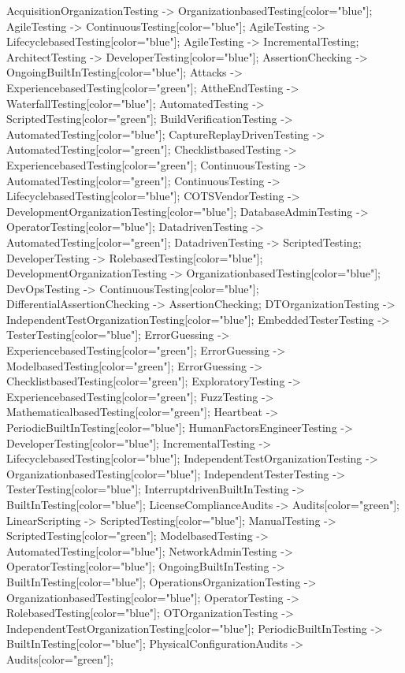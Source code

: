 \documentclass{article}
\begin{document}
{AcquisitionOrganizationTesting -> OrganizationbasedTesting[color="blue"];
AgileTesting -> ContinuousTesting[color="blue"];
AgileTesting -> LifecyclebasedTesting[color="blue"];
AgileTesting -> IncrementalTesting;
ArchitectTesting -> DeveloperTesting[color="blue"];
AssertionChecking -> OngoingBuiltInTesting[color="blue"];
Attacks -> ExperiencebasedTesting[color="green"];
AttheEndTesting -> WaterfallTesting[color="blue"];
AutomatedTesting -> ScriptedTesting[color="green"];
BuildVerificationTesting -> AutomatedTesting[color="blue"];
CaptureReplayDrivenTesting -> AutomatedTesting[color="green"];
ChecklistbasedTesting -> ExperiencebasedTesting[color="green"];
ContinuousTesting -> AutomatedTesting[color="green"];
ContinuousTesting -> LifecyclebasedTesting[color="blue"];
COTSVendorTesting -> DevelopmentOrganizationTesting[color="blue"];
DatabaseAdminTesting -> OperatorTesting[color="blue"];
DatadrivenTesting -> AutomatedTesting[color="green"];
DatadrivenTesting -> ScriptedTesting;
DeveloperTesting -> RolebasedTesting[color="blue"];
DevelopmentOrganizationTesting -> OrganizationbasedTesting[color="blue"];
DevOpsTesting -> ContinuousTesting[color="blue"];
DifferentialAssertionChecking -> AssertionChecking;
DTOrganizationTesting -> IndependentTestOrganizationTesting[color="blue"];
EmbeddedTesterTesting -> TesterTesting[color="blue"];
ErrorGuessing -> ExperiencebasedTesting[color="green"];
ErrorGuessing -> ModelbasedTesting[color="green"];
ErrorGuessing -> ChecklistbasedTesting[color="green"];
ExploratoryTesting -> ExperiencebasedTesting[color="green"];
FuzzTesting -> MathematicalbasedTesting[color="green"];
Heartbeat -> PeriodicBuiltInTesting[color="blue"];
HumanFactorsEngineerTesting -> DeveloperTesting[color="blue"];
IncrementalTesting -> LifecyclebasedTesting[color="blue"];
IndependentTestOrganizationTesting -> OrganizationbasedTesting[color="blue"];
IndependentTesterTesting -> TesterTesting[color="blue"];
InterruptdrivenBuiltInTesting -> BuiltInTesting[color="blue"];
LicenseComplianceAudits -> Audits[color="green"];
LinearScripting -> ScriptedTesting[color="blue"];
ManualTesting -> ScriptedTesting[color="green"];
ModelbasedTesting -> AutomatedTesting[color="blue"];
NetworkAdminTesting -> OperatorTesting[color="blue"];
OngoingBuiltInTesting -> BuiltInTesting[color="blue"];
OperationsOrganizationTesting -> OrganizationbasedTesting[color="blue"];
OperatorTesting -> RolebasedTesting[color="blue"];
OTOrganizationTesting -> IndependentTestOrganizationTesting[color="blue"];
PeriodicBuiltInTesting -> BuiltInTesting[color="blue"];
PhysicalConfigurationAudits -> Audits[color="green"];
}
\end{document}
